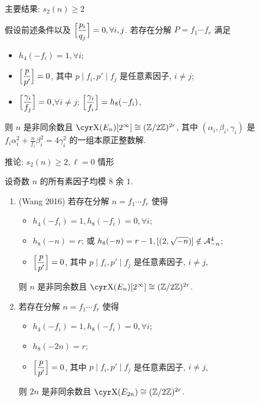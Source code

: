 \documentclass[handout,aspectratio=169]{ctexbeamer}
\renewcommand\aleg[2]{\Bigl[\dfrac{{#1}}{#2}\Bigr]}
\begin{document}
\begin{frame}{主要结果: $s_2(n)\ge 2$}
	\begin{theorem}
		假设前述条件以及 $\aleg{p_i}{q_j}=0, \forall i,j$.
		若存在分解 $P=f_1\cdots f_r$ 满足
		\begin{itemize}[<*>]
			\item $h_4(-f_i)=1,\forall i$;
			\item $\aleg{p}{p'}=0$, 其中 $p\mid f_i,p'\mid f_j$ 是任意素因子, $i\ne j$;
			\item $\aleg{\gamma_i}{f_j}=0$,$\forall i\ne j$; $\aleg{\gamma_i}{f_i}=h_8(-f_i)$,
		\end{itemize}
		则 $n$ 是非同余数且 $\Sha(E_n)[2^\infty]\cong(\BZ/2\BZ)^{2r}$,
		其中 $(\alpha_i,\beta_i,\gamma_i)$ 是  $f_i\alpha_i^2+\frac{n}{f_i}\beta_i^2=4\gamma_i^2$ 的一组本原正整数解.
	\end{theorem}
\end{frame}


\begin{frame}{推论: $s_2(n)\ge 2,\ell=0$ 情形}
	\begin{corollary}[near]
		设奇数 $n$ 的所有素因子均模 $8$ 余 $1$.
		\begin{enumerate}
			\item (Wang 2016) 若存在分解 $n=f_1\cdots f_r$ 使得
			\begin{itemize}[<*>]
				\item $h_4(-f_i)=1,h_8(-f_i)=0,\forall i$;
				\item $h_8(-n)=r$; 或 $h_8(-n)=r-1,[(2,\sqrt{-n})]\notin{\mathcal{A}}_{-n}^4$;
				\item $\aleg{p}{p'}=0$, 其中 $p\mid f_i,p'\mid f_j$ 是任意素因子, $i\ne j$,
			\end{itemize}
			则 $n$ 是非同余数且 $\Sha(E_n)[2^\infty]\cong(\BZ/2\BZ)^{2r}$.
			\item 若存在分解 $n=f_1\cdots f_r$ 使得
			\begin{itemize}[<*>]
				\item $h_4(-f_i)=1,h_8(-f_i)=0,\forall i$;
				\item $h_8(-2n)=r$;
				\item $\aleg{p}{p'}=0$, 其中 $p\mid f_i,p'\mid f_j$ 是任意素因子, $i\ne j$,
			\end{itemize}
			则 $2n$ 是非同余数且 $\Sha(E_{2n})\cong(\BZ/2\BZ)^{2r}$.
			\meddel
		\end{enumerate}
	\end{corollary}
\end{frame}
\end{document}
